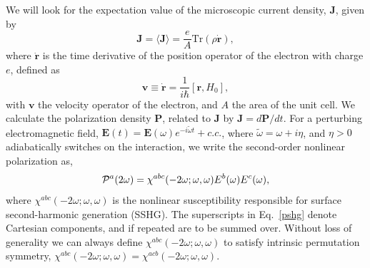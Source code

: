 \documentclass[floatfix,prb,aps,superscriptaddress,showpacs,11pt,preprint,letterpaper]{revtex4}
\begin{document}
We will look for the expectation value of the microscopic current density, 
$\mathbf{J}$, given by 
\begin{equation}
\mathbf{J}=\langle{\mathbf{J}}\rangle=\frac{e}{A}\mbox{Tr}({\rho}\dot{\mathbf{r}})
,
\label{pe}
\end{equation}
where $\dot{\mathbf{r}}$ is the time derivative of the position operator of the
electron with charge $e$, defined as
\begin{equation}
\mathbf{v}\equiv \dot{\mathbf{r}}=\frac{1}{i\hbar }[\mathbf{r},H_0],  
\label{mv}
\end{equation}
with $\mathbf{v}$ the velocity operator of the electron, and $A$ the
area of the unit cell. We calculate the polarization density 
$\mathbf{P}$, related to $\mathbf{J}$ by
$\mathbf{J}=d\mathbf{P}/dt$. For a 
perturbing electromagnetic field, $\mathbf{E}(t)=
\mathbf{E}(\omega )e^{-i\tilde{\omega} t}+c.c.$,
where $\tilde\omega=\omega+i\eta $,
and $\eta >0$ adiabatically switches on the interaction,
we write the second-order nonlinear
polarization as, 
\begin{equation}
{\mathbf{\cal P}}^a(2\omega)=\chi ^{abc}(-2\omega;\omega,\omega)E^{b}(\omega)E^{c}(\omega),  
\label{pshg}
\end{equation}
where $\chi^{abc}(-2\omega ;\omega ,\omega )$ is the nonlinear
susceptibility responsible for surface second-harmonic generation
(SSHG). 
The 
superscripts in Eq.~\eqref{pshg} denote Cartesian components, and if
repeated are to be summed over. Without loss of generality we can always
define $\chi^{abc}(-2\omega;\omega,\omega)$
 to satisfy intrinsic permutation
symmetry, 
$\chi^{abc}(-2\omega ;\omega ,\omega )=\chi ^{acb}(-2\omega ;\omega
,\omega )$.
\end{document}
